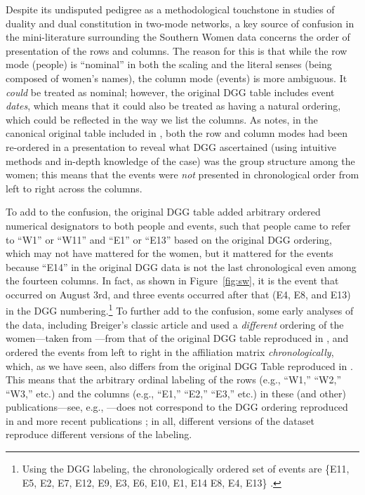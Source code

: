 \documentclass[a4paper,fleqn]{cas-sc}
\begin{document}
Despite its undisputed pedigree as a methodological touchstone in studies of duality and dual constitution in two-mode networks, a key source of confusion in the mini-literature surrounding the Southern Women data concerns the order of presentation of the rows and columns. The reason for this is that while the row mode (people) is ``nominal'' in both the scaling and the literal senses (being composed of women's names), the column mode (events) is more ambiguous. It \textit{could} be treated as nominal; however, the original DGG table includes event \textit{dates}, which means that it could also be treated as having a natural ordering, which could be reflected in the way we list the columns.  As \citet{freeman2003finding} notes, in the canonical original table included in \citet{davis1941}, both the row and column modes had been re-ordered in a presentation to reveal what DGG ascertained (using intuitive methods and in-depth knowledge of the case) was the group structure among the women; this means that the events were \textit{not} presented in chronological order from left to right across the columns. 

To add to the confusion, the original DGG table added arbitrary ordered numerical designators to both people and events, such that people came to refer to ``W1'' or ``W11'' and ``E1'' or ``E13'' based on the original DGG ordering, which may not have mattered for the women, but it mattered for the events because ``E14'' in the original DGG data is not the last chronological even among the fourteen columns. In fact, as shown in Figure~\ref{fig:sw}, it is the event that occurred on August 3rd, and three events occurred after that (E4, E8, and E13) in the DGG numbering.\footnote{Using the DGG labeling, the chronologically ordered set of events are \{E11, E5, E2, E7, E12, E9, E3, E6, E10, E1, E14 E8, E4, E13\} \citep[p. 68]{everett2018measuring}.} To further add to the confusion, some early analyses of the data, including Breiger's \citeyearpar{breiger1974duality} classic article and \citet{doreian1979evolution} used a \textit{different} ordering of the women---taken from \citet[83]{homans1950human}---from that of the original DGG table reproduced in \citet{freeman2003finding}, and ordered the events from left to right in the affiliation matrix \textit{chronologically}, which, as we have seen, also differs from the original DGG Table reproduced in \citet{freeman2003finding}. This means that the arbitrary ordinal labeling of the rows (e.g., ``W1,'' ``W2,'' ``W3,'' etc.) and the columns (e.g., ``E1,'' ``E2,'' ``E3,'' etc.) in these (and other) publications---see, e.g., \citep[table 1]{doreian1979evolution}---does not correspond to the DGG ordering reproduced in \citet{freeman2003finding} and more recent publications \citep[e.g.,][]{borgatti2014analyzing, batagelj2022analysis}; in all, different versions of the dataset reproduce different versions of the labeling. 
\end{document}
